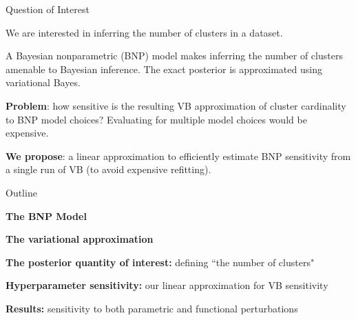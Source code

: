 \documentclass[10pt]{beamer}\usepackage[]{graphicx}\usepackage[]{color}
\begin{document}
\begin{frame}{Question of Interest}

We are interested in inferring the number of clusters in a dataset.

\pause

A Bayesian nonparametric (BNP) model makes inferring the number of clusters amenable to
Bayesian inference. The exact posterior is approximated using variational Bayes. 
\pause

\textbf{Problem}: how sensitive is the resulting
VB approximation of cluster cardinality to BNP model choices? Evaluating
for multiple model choices would be expensive. 

\pause 

\textbf{We propose}: a linear approximation to efficiently
estimate BNP sensitivity from a single run of VB (to avoid
expensive refitting). 

\end{frame}

\begin{frame}{Outline}

{\bf The BNP Model} 
\vspace{0.1in}

{\bf The variational approximation}
\vspace{0.1in}

{\bf The posterior quantity of interest:} defining ``the number of clusters"
\vspace{0.1in}

{\bf Hyperparameter sensitivity:} our linear approximation for VB sensitivity
\vspace{0.1in}

{\bf Results:} sensitivity to both parametric and functional perturbations

\end{frame}
\end{document}

